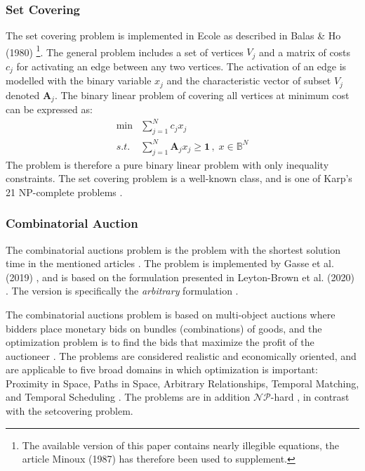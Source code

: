 \subsubsection{Set Covering}

The set covering problem is implemented in \gls{Ecole} as described in Balas \& Ho (1980)\cite{balas1980set} \footnote{The available version of this paper contains nearly illegible equations, the article Minoux (1987) \cite{minoux1987class} has therefore been used to supplement.}. The general problem includes a set of vertices $V_j$ and a matrix of costs $c_j$ for activating an edge between any two vertices. The activation of an edge is modelled with the binary variable $x_j$ and the characteristic vector of subset $V_j$ denoted $\textbf{A}_j$. The binary linear problem of covering all vertices at minimum cost can be expressed as: 
\begin{align}
    \min &\sum_{j=1}^N c_j x_j \\ s.t. \; &\sum_{j=1}^N \mathbf{A}_j x_j \geq \mathbf{1} \,,\; x \in \mathbb{B}^N 
\end{align}
The problem is therefore a pure binary linear problem with only inequality constraints. The set covering problem is a well-known class, and is one of Karp's 21 \gls{NP}-complete problems \cite{karp1972reducibility}.  

\subsubsection{Combinatorial Auction}

The combinatorial auctions problem is the problem with the shortest solution time in the mentioned articles \cite{gasse2019exact,gupta2020hybrid}. The problem is implemented by Gasse et al. (2019) \cite{gasse2019exact}, and is based on the formulation presented in Leyton-Brown et al. (2020) \cite{brown2000towards}. The version is specifically the \textit{arbitrary} formulation \cite{brown2000towards}.  

The combinatorial auctions problem is based on multi-object auctions where bidders place monetary bids on bundles (combinations) of goods, and the optimization problem is to find the bids that maximize the profit of the auctioneer \cite{brown2000towards}. The problems are considered realistic and economically oriented, and are applicable to five broad domains in which optimization is important: Proximity in Space, Paths in Space, Arbitrary Relationships, Temporal Matching, and Temporal Scheduling \cite{brown2000towards}. The problems are in addition $\mathcal{NP}$-hard \cite{dong2012combinatorial}, in contrast with the setcovering problem. 

